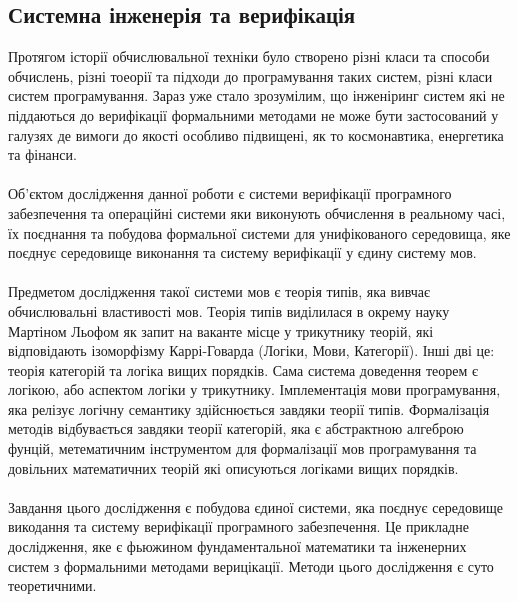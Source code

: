 \documentclass[11pt,oneside]{article}
\begin{document}
\vspace{1cm}


\subsection{Системна інженерія та верифікація}

    Протягом історії обчислювальної техніки було створено різні класи та способи обчислень,
    різні тоеорії та підходи до програмування таких систем, різні класи систем програмування.
    Зараз уже стало зрозумілим, що інженіринг систем які не піддаються до верифікації
    формальними методами не може бути застосований у галузях де вимоги до якості
    особливо підвищені, як то космонавтика, енергетика та фінанси.

    \paragraph{}
    Об'єктом дослідження данної роботи є системи верифікації програмного забезпечення
    та операційні системи яки виконують обчислення в реальному часі, їх поєднання
    та побудова формальної системи для унифікованого середовища, яке поєднує
    середовище виконання та систему верифікації у єдину систему мов.

    \paragraph{}
    Предметом дослідження такої системи мов є теорія типів, яка вивчає обчислювальні властивості мов.
    Теорія типів виділилася в окрему науку Мартіном Льофом як запит на ваканте місце у
    трикутнику теорій, які відповідають ізоморфізму Каррі-Говарда (Логіки, Мови, Категорії).
    Інші дві це: теорія категорій та логіка вищих порядків. Сама система доведення теорем є
    логікою, або аспектом логіки у трикутнику. Імплементація мови програмування,
    яка релізує логічну семантику здійснюється завдяки теорії типів. Формалізація методів
    відбувається завдяки теорії категорій, яка є абстрактною алгеброю фунцій,
    метематичним інструментом для формалізації мов програмування та довільних
    математичних теорій які описуються логіками вищих порядків.

    \paragraph{}
    Завдання цього дослідження є побудова єдиної системи, яка поєднує середовище
    викодання та систему верифікації програмного забезпечення. Це прикладне дослідження,
    яке є фьюжином фундаментальної математики та інженерних систем з формальними методами верицікації.
    Методи цього дослідження є суто теоретичними.
\end{document}
